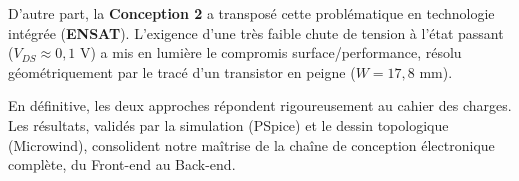 \documentclass[11pt,a4paper]{article}
\begin{document}
D'autre part, la \textbf{Conception 2} a transposé cette problématique en technologie intégrée (\textbf{ENSAT}). L'exigence d'une très faible chute de tension à l'état passant ($V_{DS} \approx 0{,}1\text{ V}$) a mis en lumière le compromis surface/performance, résolu géométriquement par le tracé d'un transistor en peigne ($W = 17{,}8\text{ mm}$).

En définitive, les deux approches répondent rigoureusement au cahier des charges. Les résultats, validés par la simulation (PSpice) et le dessin topologique (Microwind), consolident notre maîtrise de la chaîne de conception électronique complète, du Front-end au Back-end.
\newpage


\end{document}
